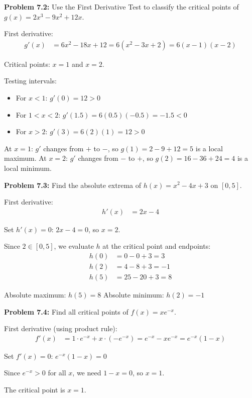 \documentclass[12pt,a4paper]{book}
\theoremstyle{definition}
\begin{document}
\begin{solution}
\textbf{Problem 7.2:} Use the First Derivative Test to classify the critical points of $g(x) = 2x^3 - 9x^2 + 12x$.

First derivative:
\begin{align}
g'(x) &= 6x^2 - 18x + 12 = 6(x^2 - 3x + 2) = 6(x - 1)(x - 2)
\end{align}

Critical points: $x = 1$ and $x = 2$.

Testing intervals:
\begin{itemize}
    \item For $x < 1$: $g'(0) = 12 > 0$
    \item For $1 < x < 2$: $g'(1.5) = 6(0.5)(-0.5) = -1.5 < 0$
    \item For $x > 2$: $g'(3) = 6(2)(1) = 12 > 0$
\end{itemize}

At $x = 1$: $g'$ changes from $+$ to $-$, so $g(1) = 2 - 9 + 12 = 5$ is a local maximum.
At $x = 2$: $g'$ changes from $-$ to $+$, so $g(2) = 16 - 36 + 24 = 4$ is a local minimum.
\end{solution}

\begin{solution}
\textbf{Problem 7.3:} Find the absolute extrema of $h(x) = x^2 - 4x + 3$ on $[0, 5]$.

First derivative:
\begin{align}
h'(x) &= 2x - 4
\end{align}

Set $h'(x) = 0$: $2x - 4 = 0$, so $x = 2$.

Since $2 \in [0, 5]$, we evaluate $h$ at the critical point and endpoints:
\begin{align}
h(0) &= 0 - 0 + 3 = 3\\
h(2) &= 4 - 8 + 3 = -1\\
h(5) &= 25 - 20 + 3 = 8
\end{align}

Absolute maximum: $h(5) = 8$
Absolute minimum: $h(2) = -1$
\end{solution}

\begin{solution}
\textbf{Problem 7.4:} Find all critical points of $f(x) = xe^{-x}$.

First derivative (using product rule):
\begin{align}
f'(x) &= 1 \cdot e^{-x} + x \cdot (-e^{-x}) = e^{-x} - xe^{-x} = e^{-x}(1 - x)
\end{align}

Set $f'(x) = 0$: $e^{-x}(1 - x) = 0$

Since $e^{-x} > 0$ for all $x$, we need $1 - x = 0$, so $x = 1$.

The critical point is $x = 1$.
\end{solution}
\end{document}
